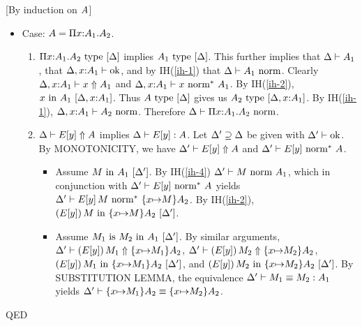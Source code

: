 \documentclass{article}
\theoremstyle{break}
\newcommand{\qed}{\mbox{QED}}
\newenvironment{proof}{\noindent{\bf Proof:}\hspace*{0.5em}}{\hspace*{\fill}\qed}
\begin{document}
\begin{proof}[By induction on $\kind$]
\begin{itemize}
\item Case: $\kind=\kpi{\cvar}{\kind_1}{\kind_2}$.
\begin{enumerate}
\item 
$\semanticvalidtype{\world}{\kpi{\cvar}{\kind_1}{\kind_2}}$ implies
$\semanticvalidtype{\world}{\kind_1}$.  This further implies that
$\validkind{\world}{\kind_1}$, that $\validcontext{\world,\cvar{:}\kind_1}$, and
by IH(\ref{ih-1}) that $\normtype{\world}{\kind_1}$.
Clearly $\reconstruct{\world,\cvar{:}\kind_1}{\cvar}{\kind_1}$ and 
$\normE{\world,\cvar{:}\kind_1}{\cvar}{\kind_1}$.  By
IH(\ref{ih-2}), $\semanticvalidterm{\world,\cvar{:}\kind_1}{\cvar}{\kind_1}$.
Thus $\semanticvalidtype{\world}{\kind}$ gives us
$\semanticvalidtype{\world,\cvar{:}\kind_1}{\kind_2}$.  By IH(\ref{ih-1}),
$\normtype{\world,\cvar{:}\kind_1}{\kind_2}$.  Therefore
$\normtype{\world}{\kpi{\cvar}{\kind_1}{\kind_2}}$.
\item $\reconstruct{\world}{E[\othercvar]}{\kind}$ implies
$\validconstructor{\world}{E[\othercvar]}{\kind}$.
Let $\world'\supseteq\world$ be given with $\validcontext{\world'}$.
By MONOTONICITY, we have $\reconstruct{\world'}{E[\othercvar]}{\kind}$ and
$\normE{\world'}{E[\othercvar]}{\kind}$.
\begin{itemize}
\item Assume $\semanticvalidterm{\world'}{\constructor}{\kind_1}$.
By IH(\ref{ih-4}) $\normterm{\world'}{\constructor}{\kind_1}$, which
in conjunction with $\normE{\world'}{E[\othercvar]}{\kind}$ yields
$\normE{\world'}{\capply{E[\othercvar]}{\constructor}}{\substitute{\cvar}{\constructor}{\kind_2}}$.
By IH(\ref{ih-2}),
$\semanticvalidterm{\world'}{\capply{(E[\othercvar])}{\constructor}}{\substitute{\cvar}{\constructor}{\kind_2}}$.
\item Assume $\semanticequivterm{\world'}{\constructor_1}{\constructor_2}{\kind_1}$.
By similar arguments, 
$\reconstruct{\world'}{\capply{(E[\othercvar])}{\constructor_1}}{\substitute{\cvar}{\constructor_1}{\kind_2}}$,
$\reconstruct{\world'}{\capply{(E[\othercvar])}{\constructor_2}}{\substitute{\cvar}{\constructor_2}{\kind_2}}$,
$\semanticvalidterm{\world'}{\capply{(E[\othercvar])}{\constructor_1}}{\substitute{\cvar}{\constructor_1}{\kind_2}}$, and
$\semanticvalidterm{\world'}{\capply{(E[\othercvar])}{\constructor_2}}{\substitute{\cvar}{\constructor_2}{\kind_2}}$.
By SUBSTITUTION LEMMA, the equivalence
$\equivconstructor{\world'}{\constructor_1}{\constructor_2}{\kind_1}$ yields
$\equivkind{\world'}{\substitute{\cvar}{\constructor_1}{\kind_2}}{\substitute{\cvar}{\constructor_2}{\kind_2}}$.

\end{itemize}
\end{enumerate}
\end{itemize}
\end{proof}
\end{document}
